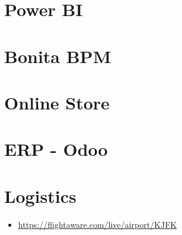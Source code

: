 \documentclass[]{book}
\providecommand{\tightlist}{%
  \setlength{\itemsep}{0pt}\setlength{\parskip}{0pt}}
\begin{document}
\hypertarget{power-bi}{%
\section{Power BI}\label{power-bi}}

\hypertarget{bonita-bpm}{%
\section{Bonita BPM}\label{bonita-bpm}}

\hypertarget{online-store-1}{%
\section{Online Store}\label{online-store-1}}

\hypertarget{erp---odoo}{%
\section{ERP - Odoo}\label{erp---odoo}}

\hypertarget{logistics-1}{%
\section{Logistics}\label{logistics-1}}

\begin{itemize}
\tightlist
\item
  \url{https://flightaware.com/live/airport/KJFK}
\end{itemize}


\end{document}
